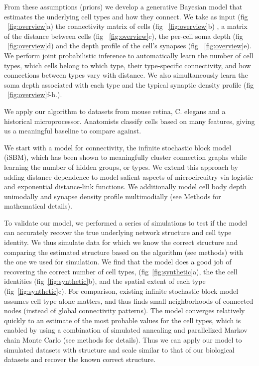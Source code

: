 \documentclass{article}
\begin{document}
From these assumptions (priors) we develop a generative Bayesian model
that estimates the underlying cell types and how they connect. We take
as input (fig ~\ref{fig:overview}a) the connectivity matrix of cells (fig ~\ref{fig:overview}b) ,
a matrix of the distance between cells (fig ~\ref{fig:overview}c), the per-cell soma depth
(fig ~\ref{fig:overview}d) and the depth profile of the cell's
synapses (fig ~\ref{fig:overview}e). We perform joint probabilistic
inference to automatically learn the number of cell types, which cells
belong to which type, their type-specific connectivity, and how
connections between types vary with distance. We also simultaneously
learn the soma depth associated with each type and the typical
synaptic density profile (fig ~\ref{fig:overview}f-h.).

We apply our algorithm to datasets from mouse
retina, C. elegans and a historical microprocessor. Anatomists
classify cells based on many features, giving us a meaningful baseline
to compare against.

We start with a model for connectivity, the infinite stochastic block
model (iSBM)\autocite{Kemp2006a,Xu2006}, which has been shown to
meaningfully cluster connection graphs while learning the number of
hidden groups, or types. We extend this approach by adding distance
dependence to model salient aspects of microcircuitry via logistic and
exponential distance-link functions.  We additionally model cell body
depth unimodally and synapse density profile multimodially (see
Methods for mathematical details).

To validate our model, we performed a series of simulations to test if
the model can accurately recover the true underlying network structure
and cell type identity.  We thus simulate data for which we know the
correct structure and comparing the estimated structure based on the
algorithm (see methods) with the one we used for simulation. We find
that the model does a good job of recovering the correct number of
cell types, (fig~\ref{fig:synthetic}a), the the cell identities
(fig~\ref{fig:synthetic}b), and the spatial extent of each type
(fig~\ref{fig:synthetic}c).  For comparison, existing infinite stochastic block model assumes cell type alone matters, and thus finds small neighborhoods of connected nodes (instead of global connectivity patterns). The model converges
relatively quickly to an estimate of the most probable values for the
cell types, which is enabled by using a combination of simulated
annealing and parallelized Markov chain Monte Carlo (see methods for
details). Thus we can apply our model to simulated datasets with structure
and scale similar to that of our biological datasets and recover the known 
correct structure. 
\end{document}
